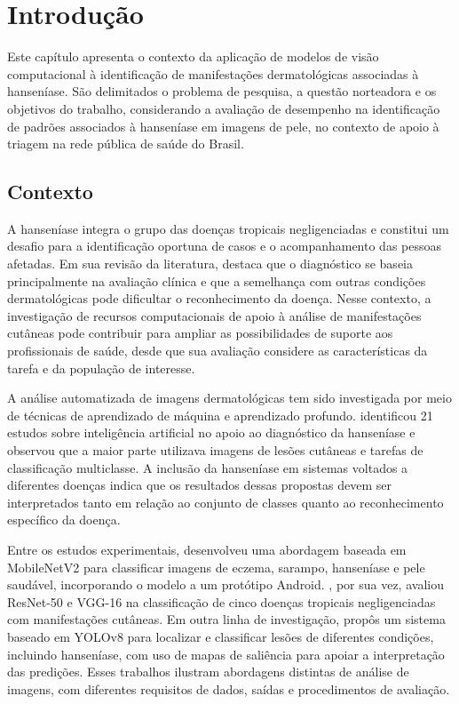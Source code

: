 \chapter{Introdução}

Este capítulo apresenta o contexto da aplicação de modelos de visão
computacional à identificação de manifestações dermatológicas associadas
à hanseníase. São delimitados o problema de pesquisa, a questão
norteadora e os objetivos do trabalho, considerando a avaliação de
desempenho na identificação de padrões associados à hanseníase em
imagens de pele, no contexto de apoio à triagem na rede pública de saúde
do Brasil.

\section{Contexto}\label{contexto}

A hanseníase integra o grupo das doenças tropicais negligenciadas e
constitui um desafio para a identificação oportuna de casos e o
acompanhamento das pessoas afetadas. Em sua revisão da literatura,
 destaca que o diagnóstico se baseia
principalmente na avaliação clínica e que a semelhança com outras
condições dermatológicas pode dificultar o reconhecimento da doença.
Nesse contexto, a investigação de recursos computacionais de apoio à
análise de manifestações cutâneas pode contribuir para ampliar as
possibilidades de suporte aos profissionais de saúde, desde que sua
avaliação considere as características da tarefa e da população de
interesse.

A análise automatizada de imagens dermatológicas tem sido investigada
por meio de técnicas de aprendizado de máquina e aprendizado profundo.
 identificou 21 estudos sobre inteligência
artificial no apoio ao diagnóstico da hanseníase e observou que a
maior parte utilizava imagens de lesões cutâneas e tarefas de
classificação multiclasse. A inclusão da hanseníase em sistemas voltados
a diferentes doenças indica que os resultados dessas propostas devem ser
interpretados tanto em relação ao conjunto de classes quanto ao
reconhecimento específico da doença.

Entre os estudos experimentais, 
desenvolveu uma abordagem baseada em MobileNetV2 para classificar
imagens de eczema, sarampo, hanseníase e pele saudável, incorporando o
modelo a um protótipo Android. , por sua vez,
avaliou ResNet-50 e VGG-16 na classificação de cinco doenças tropicais
negligenciadas com manifestações cutâneas. Em outra linha de
investigação,  propôs um sistema baseado em YOLOv8
para localizar e classificar lesões de diferentes condições, incluindo
hanseníase, com uso de mapas de saliência para apoiar a interpretação
das predições. Esses trabalhos ilustram abordagens distintas de análise
de imagens, com diferentes requisitos de dados, saídas e procedimentos
de avaliação.

